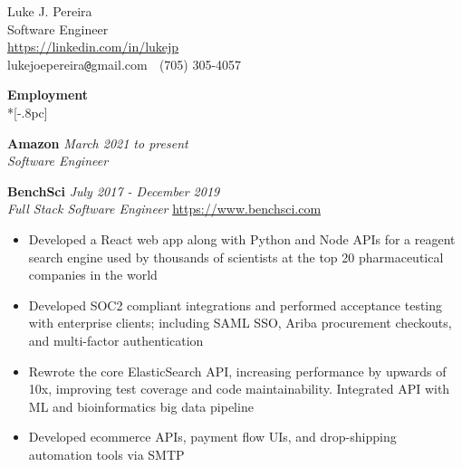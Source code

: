 \documentclass{article}
\begin{document}
\begin{center}
{\Large Luke J. Pereira} \\[.5pc]
Software Engineer \\[.2pc]
\url{https://linkedin.com/in/lukejp} \\[.2pc]
lukejoepereira\verb|@|gmail.com $\;$ (705) 305-4057\\[3pc]
\end{center}
\vspace{-25pt}

{\large \bf Employment} \\*[-.8pc]
\underline{\hspace{6.1in}}

{\bf Amazon } \hfill {\it March 2021 to present\/} \\
\textit{Software Engineer} \hfill

{\bf  BenchSci } \hfill {\it July 2017 - December 2019 \/} \\
\textit{Full Stack Software Engineer} \hfill \url{https://www.benchsci.com}
\begin{itemize}[leftmargin=*]
    \itemsep0em
    \renewcommand\labelitemi{\tiny$\bullet$}
    \item Developed a React web app along with Python and Node APIs for a reagent search engine used by thousands of scientists at the top 20 pharmaceutical companies in the world
    \item Developed SOC2 compliant integrations and performed acceptance testing  with enterprise clients; including SAML SSO, Ariba procurement checkouts, and multi-factor authentication
    \item Rewrote the core ElasticSearch API, increasing performance by upwards of 10x, improving test coverage and code maintainability. Integrated API with ML and bioinformatics big data pipeline
    \item Developed ecommerce APIs, payment flow UIs, and drop-shipping automation tools via SMTP
\end{itemize}
\end{document}
